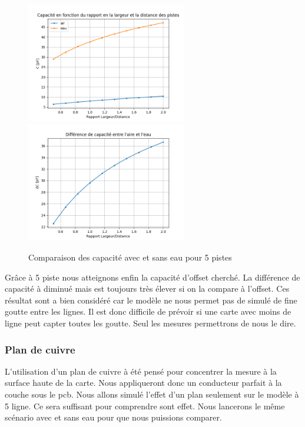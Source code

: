 \begin{figure}[!ht]
 \centering
 \includegraphics[width=7cm]{C5Graph1.png}
 \includegraphics[width=7cm]{C5Graph2.png}
 \caption{Comparaison des capacité avec et sans eau pour 5 pistes}
\end{figure}
\newpage

Grâce à 5 piste nous atteignons enfin la capacité d'offset cherché. La différence de capacité à diminué mais est toujours très élever si on la compare à l'offset. Ces résultat sont a bien considéré car le modèle ne nous permet pas de simulé de fine goutte entre les lignes. Il est donc difficile de prévoir si une carte avec moins de ligne peut capter toutes les goutte. Seul les mesures permettrons de nous le dire. 

\subsubsection{Plan de cuivre}

L'utilisation d'un plan de cuivre à été pensé pour concentrer la mesure à la surface haute de la carte. Nous appliqueront donc un conducteur parfait à la couche sous le pcb. Nous allons simulé l'effet d'un plan seulement sur le modèle à 5 ligne. Ce sera suffisant pour comprendre sont effet. Nous lancerons le même scénario avec et sans eau pour que nous puissions comparer.

